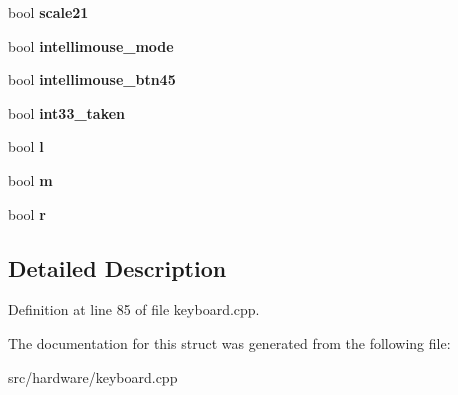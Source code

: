 \begin{DoxyCompactItemize}
\item 
\hypertarget{structps2mouse_ab6d41806329d94ccd788853e8b6f36f3}{bool {\bfseries scale21}}\label{structps2mouse_ab6d41806329d94ccd788853e8b6f36f3}

\item 
\hypertarget{structps2mouse_afbc6ac0efb4991a79f66e5e5e2a89b19}{bool {\bfseries intellimouse\-\_\-mode}}\label{structps2mouse_afbc6ac0efb4991a79f66e5e5e2a89b19}

\item 
\hypertarget{structps2mouse_aa2d43c441bced55d4aa4bf18f42a3fb9}{bool {\bfseries intellimouse\-\_\-btn45}}\label{structps2mouse_aa2d43c441bced55d4aa4bf18f42a3fb9}

\item 
\hypertarget{structps2mouse_a24804c088c3b53b0e5425819a844cffc}{bool {\bfseries int33\-\_\-taken}}\label{structps2mouse_a24804c088c3b53b0e5425819a844cffc}

\item 
\hypertarget{structps2mouse_ad012940ddb2e6e826edc420d5cdc9871}{bool {\bfseries l}}\label{structps2mouse_ad012940ddb2e6e826edc420d5cdc9871}

\item 
\hypertarget{structps2mouse_ad94f7a068aab0cef083a02033d8c2671}{bool {\bfseries m}}\label{structps2mouse_ad94f7a068aab0cef083a02033d8c2671}

\item 
\hypertarget{structps2mouse_a38da8cabd941a1a374da3b35ef90ff35}{bool {\bfseries r}}\label{structps2mouse_a38da8cabd941a1a374da3b35ef90ff35}

\end{DoxyCompactItemize}


\subsection{Detailed Description}


Definition at line 85 of file keyboard.\-cpp.



The documentation for this struct was generated from the following file\-:\begin{DoxyCompactItemize}
\item 
src/hardware/keyboard.\-cpp\end{DoxyCompactItemize}
